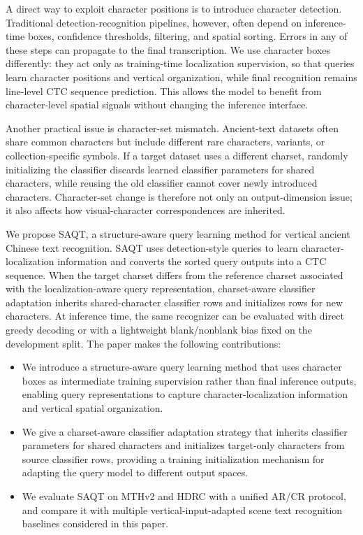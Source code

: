 A direct way to exploit character positions is to introduce character detection. Traditional detection-recognition pipelines, however, often depend on inference-time boxes, confidence thresholds, filtering, and spatial sorting. Errors in any of these steps can propagate to the final transcription. We use character boxes differently: they act only as training-time localization supervision, so that queries learn character positions and vertical organization, while final recognition remains line-level CTC sequence prediction. This allows the model to benefit from character-level spatial signals without changing the inference interface.

Another practical issue is character-set mismatch. Ancient-text datasets often share common characters but include different rare characters, variants, or collection-specific symbols. If a target dataset uses a different charset, randomly initializing the classifier discards learned classifier parameters for shared characters, while reusing the old classifier cannot cover newly introduced characters. Character-set change is therefore not only an output-dimension issue; it also affects how visual-character correspondences are inherited.

We propose SAQT, a structure-aware query learning method for vertical ancient Chinese text recognition. SAQT uses detection-style queries to learn character-localization information and converts the sorted query outputs into a CTC sequence. When the target charset differs from the reference charset associated with the localization-aware query representation, charset-aware classifier adaptation inherits shared-character classifier rows and initializes rows for new characters. At inference time, the same recognizer can be evaluated with direct greedy decoding or with a lightweight blank/nonblank bias fixed on the development split. The paper makes the following contributions:

\begin{itemize}
  \item We introduce a structure-aware query learning method that uses character boxes as intermediate training supervision rather than final inference outputs, enabling query representations to capture character-localization information and vertical spatial organization.
  \item We give a charset-aware classifier adaptation strategy that inherits classifier parameters for shared characters and initializes target-only characters from source classifier rows, providing a training initialization mechanism for adapting the query model to different output spaces.
  \item We evaluate SAQT on MTHv2 and HDRC with a unified AR/CR protocol, and compare it with multiple vertical-input-adapted scene text recognition baselines considered in this paper.
\end{itemize}
